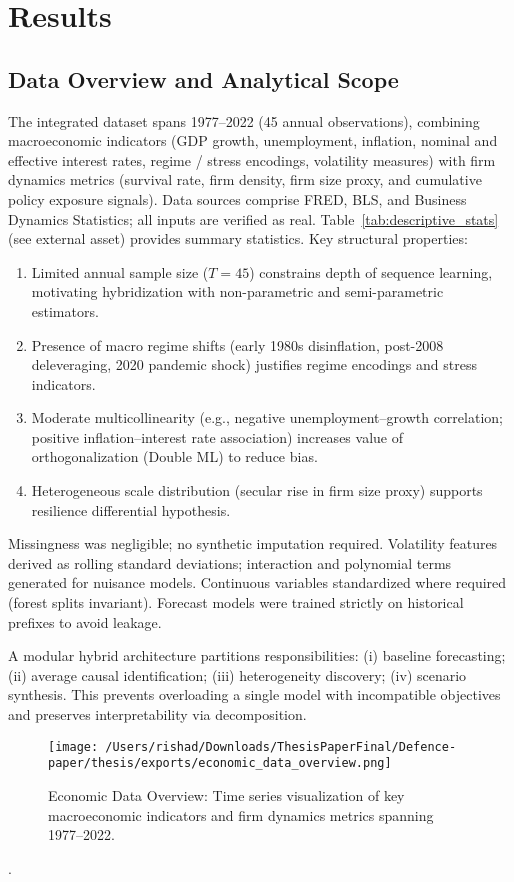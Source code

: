 \section{Results}\label{sec:results}

\subsection{Data Overview and Analytical Scope}
The integrated dataset spans 1977--2022 (45 annual observations), combining macroeconomic indicators (GDP growth, unemployment, inflation, nominal and effective interest rates, regime / stress encodings, volatility measures) with firm dynamics metrics (survival rate, firm density, firm size proxy, and cumulative policy exposure signals). Data sources comprise FRED, BLS, and Business Dynamics Statistics; all inputs are verified as real. Table~\ref{tab:descriptive_stats} (see external asset) provides summary statistics. Key structural properties:
\begin{enumerate}
  \item Limited annual sample size ($T=45$) constrains depth of sequence learning, motivating hybridization with non-parametric and semi-parametric estimators.
  \item Presence of macro regime shifts (early 1980s disinflation, post-2008 deleveraging, 2020 pandemic shock) justifies regime encodings and stress indicators.
  \item Moderate multicollinearity (e.g., negative unemployment--growth correlation; positive inflation--interest rate association) increases value of orthogonalization (Double ML) to reduce bias.
  \item Heterogeneous scale distribution (secular rise in firm size proxy) supports resilience differential hypothesis.
\end{enumerate}
Missingness was negligible; no synthetic imputation required. Volatility features derived as rolling standard deviations; interaction and polynomial terms generated for nuisance models. Continuous variables standardized where required (forest splits invariant). Forecast models were trained strictly on historical prefixes to avoid leakage.

A modular hybrid architecture partitions responsibilities: (i) baseline forecasting; (ii) average causal identification; (iii) heterogeneity discovery; (iv) scenario synthesis. This prevents overloading a single model with incompatible objectives and preserves interpretability via decomposition.
\begin{figure}[H]
\centering
\texttt{[image: /Users/rishad/Downloads/ThesisPaperFinal/Defence-paper/thesis/exports/economic\_data\_overview.png]}
\caption{Economic Data Overview: Time series visualization of key macroeconomic indicators and firm dynamics metrics spanning 1977--2022.}
\label{fig:economic_data_overview}
\end{figure}
.




